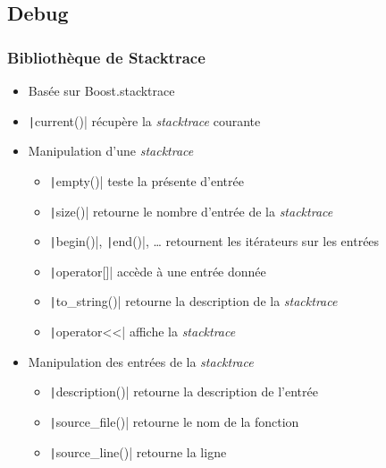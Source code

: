 \documentclass[C++.tex]{subfiles}
\begin{document}
\subsection*{Debug}
\begin{frame}[fragile]
	\frametitle{Bibliothèque de Stacktrace}
	\begin{itemize}
		\item Basée sur Boost.stacktrace
		\item \texttt|current()| récupère la \textit{stacktrace} courante
		\item Manipulation d'une \textit{stacktrace}
		\begin{itemize}
			\item \texttt|empty()| teste la présente d'entrée
			\item \texttt|size()| retourne le nombre d'entrée de la \textit{stacktrace}
			\item \texttt|begin()|, \texttt|end()|, \ldots{} retournent les itérateurs sur les entrées
			\item \texttt|operator[]| accède à une entrée donnée
			\item \texttt|to_string()| retourne la description de la \textit{stacktrace}
			\item \texttt|operator<<| affiche la \textit{stacktrace}
		\end{itemize}
		\item Manipulation des entrées de la \textit{stacktrace}
		\begin{itemize}
			\item \texttt|description()| retourne la description de l'entrée
			\item \texttt|source_file()| retourne le nom de la fonction
			\item \texttt|source_line()| retourne la ligne
		\end{itemize}
	\end{itemize}
\end{frame}
\end{document}
